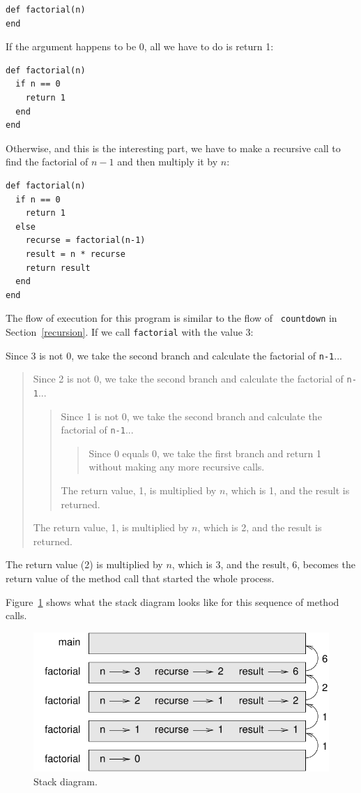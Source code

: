 \documentclass[10pt]{book}
\begin{document}
\begin{verbatim}
def factorial(n)
end
\end{verbatim}
%
If the argument happens to be 0, all we have to do is return 1:

\begin{verbatim}
def factorial(n)
  if n == 0
    return 1
  end
end
\end{verbatim}
%
Otherwise, and this is the interesting part, we have to make a
recursive call to find the factorial of $n-1$ and then multiply it by
$n$:

\begin{verbatim}
def factorial(n)
  if n == 0
    return 1
  else
    recurse = factorial(n-1)
    result = n * recurse
    return result
  end
end
\end{verbatim}
%
The flow of execution for this program is similar to the flow of {\tt
countdown} in Section~\ref{recursion}.  If we call {\tt factorial}
with the value 3:

Since 3 is not 0, we take the second branch and calculate the factorial
of {\tt n-1}...

\begin{quote}
Since 2 is not 0, we take the second branch and calculate the factorial of
{\tt n-1}...


  \begin{quote}
  Since 1 is not 0, we take the second branch and calculate the factorial
  of {\tt n-1}...


    \begin{quote}
    Since 0 equals 0, we take the first branch and return 1
    without making any more recursive calls.
    \end{quote}


  The return value, 1, is multiplied by $n$, which is 1, and the
  result is returned.
  \end{quote}


The return value, 1, is multiplied by $n$, which is 2, and the
result is returned.
\end{quote}


The return value (2) is multiplied by $n$, which is 3, and the result, 6,
becomes the return value of the method call that started the whole
process.

Figure~\ref{fig.stack3} shows what the stack diagram looks like for
this sequence of method calls.

\begin{figure}
\centerline
{\includegraphics[scale=0.8]{figs/stack3.pdf}}
\caption{Stack diagram.}
\label{fig.stack3}
\end{figure}
\end{document}
